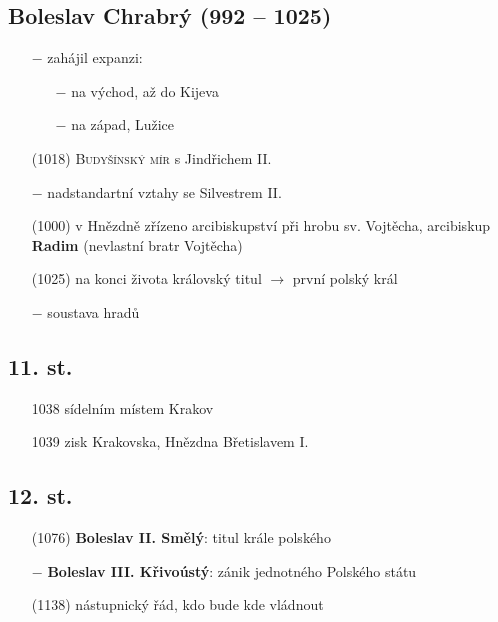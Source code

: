 \documentclass{article}
\begin{document}
\subsection*{Boleslav Chrabrý (992 -- 1025)}
\begin{itemize}
    \vspace{-0.5em}
    \setlength\itemsep{0.15em}
    \item[$-$] zahájil expanzi:
    \begin{itemize}
        \vspace{-0.5em}
        \setlength\itemsep{0.15em}
        \item[$-$] na východ, až do Kijeva
        \item[$-$] na západ, Lužice
    \end{itemize}
    \item[(1018)] \textsc{Budyšínský mír} s Jindřichem II.
    \item[$-$] nadstandartní vztahy se Silvestrem II.
    \item[(1000)] v Hnězdně zřízeno arcibiskupství při hrobu sv. Vojtěcha, arcibiskup \textbf{Radim} (nevlastní bratr Vojtěcha)
    \item[(1025)] na konci života královský titul $\rightarrow$ první polský král
    \item[$-$] soustava hradů
\end{itemize}

\subsection*{11. st.}
\begin{itemize}
    \vspace{-0.5em}
    \setlength\itemsep{0.15em}
    \item[1038] sídelním místem Krakov
    \item[1039] zisk Krakovska, Hnězdna Břetislavem I.
\end{itemize}

\subsection*{12. st.}
\begin{itemize}
    \vspace{-0.5em}
    \setlength\itemsep{0.15em}
    \item[(1076)] \textbf{Boleslav II. Smělý}: titul krále polského
    \item[$-$] \textbf{Boleslav III. Křivoústý}: zánik jednotného Polského státu
    \item[(1138)] nástupnický řád, kdo bude kde vládnout
\end{itemize}
\end{document}
